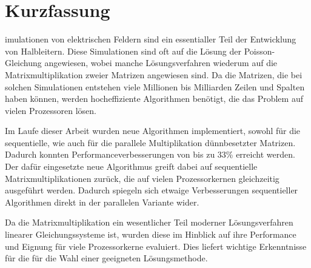 %
%
%

\chapter*{Kurzfassung}




imulationen von elektrischen Feldern sind ein essentialler Teil der Entwicklung von Halbleitern. Diese Simulationen sind oft auf die Lösung der Poisson-Gleichung angewiesen, wobei manche Lösungsverfahren wiederum auf die Matrixmultiplikation zweier Matrizen angewiesen sind. Da die Matrizen, die bei solchen Simulationen entstehen viele Millionen bis Milliarden Zeilen und Spalten haben können, werden hocheffiziente Algorithmen benötigt, die das Problem auf vielen Prozessoren lösen. 

Im Laufe dieser Arbeit wurden neue Algorithmen implementiert, sowohl für die sequentielle, wie auch für die parallele Multiplikation dünnbesetzter Matrizen. Dadurch konnten Performanceverbesserungen von bis zu 33\% erreicht werden. Der dafür eingesetzte neue Algorithmus greift dabei auf sequentielle Matrixmultiplikationen zurück, die auf vielen Prozessorkernen gleichzeitig ausgeführt werden. Dadurch spiegeln sich etwaige Verbesserungen sequentieller Algorithmen direkt in der parallelen Variante wider. 

Da die Matrixmultiplikation ein wesentlicher Teil moderner Lösungsverfahren linearer Gleichungssysteme ist, wurden diese im Hinblick auf ihre Performance und Eignung für viele Prozessorkerne evaluiert. Dies liefert wichtige Erkenntnisse für die für die Wahl einer geeigneten Lösungsmethode.

\clearpage